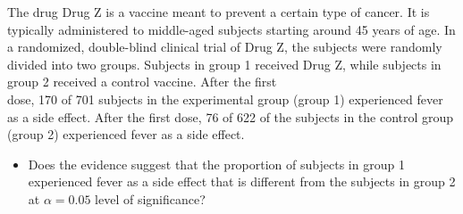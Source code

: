 \documentclass[11pt, chapterprefix=true]{scrbook}\usepackage[]{graphicx}\usepackage[]{color}
\begin{document}
\begin{exercises}
%   
\begin{exercise}   %

The drug Drug Z is a vaccine meant to prevent a certain type of cancer.  It is typically administered to middle-aged subjects starting around 45 years of age.  In a randomized, double-blind clinical trial of Drug Z,  the subjects were randomly divided into two groups.  Subjects in group 1 received Drug Z, while subjects in group 2 received a control vaccine.  After the first \\ dose, 170 of 701 subjects in the experimental group (group 1) experienced fever as a side effect.  After the first dose, 76 of 622 of the subjects in the control group (group 2) experienced fever as a side effect.

\begin{itemize}
\item Does the evidence suggest that the proportion of subjects in group 1  experienced fever as a side effect that is different from the subjects in group 2 at $\alpha = 0.05$ level of significance?
 \end{itemize}
	  \vspace{5mm}


\end{exercise}
\end{exercises}
\end{document}
